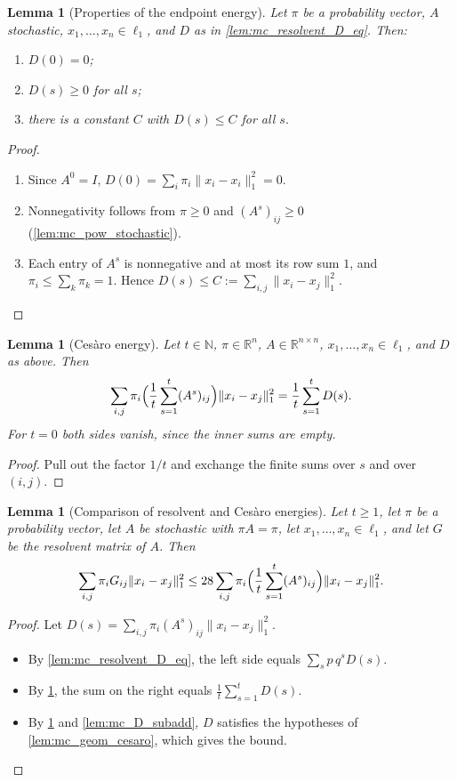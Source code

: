 \documentclass[11pt]{article}
\newtheorem{lemma}[theorem]{Lemma}
\theoremstyle{definition}
\theoremstyle{remark}
\newcommand{\R}{\mathbb{R}}
\newcommand{\N}{\mathbb{N}}
\newcommand{\lnorm}[1]{\lVert #1\rVert_{1}}
\begin{document}
\begin{lemma}[Properties of the endpoint energy]\label{lem:mc_D_props}
Let $\pi$ be a probability vector, $A$ stochastic, $x_1,\dots,x_n\in\ell_1$, and $D$ as in \cref{lem:mc_resolvent_D_eq}. Then:
\begin{enumerate}
\item $D(0)=0$;
\item $D(s)\ge0$ for all $s$;
\item there is a constant $C$ with $D(s)\le C$ for all $s$.
\end{enumerate}
\end{lemma}
\begin{proof}
\begin{enumerate}
\item Since $A^0=I$, $D(0)=\sum_i\pi_i\lnorm{x_i-x_i}^2=0$.
\item Nonnegativity follows from $\pi\ge0$ and $(A^s)_{ij}\ge0$ (\cref{lem:mc_pow_stochastic}).
\item Each entry of $A^s$ is nonnegative and at most its row sum $1$, and $\pi_i\le\sum_k\pi_k=1$. Hence $D(s)\le C:=\sum_{i,j}\lnorm{x_i-x_j}^2$. \qedhere
\end{enumerate}
\end{proof}

\begin{lemma}[Ces\`aro energy]\label{lem:mc_cesaro_rhs_eq}
Let $t\in\N$, $\pi\in\R^n$, $A\in\R^{n\times n}$, $x_1,\dots,x_n\in\ell_1$, and $D$ as above. Then
\[
\sum_{i,j}\pi_i\Bigl(\frac1t\sum_{s=1}^t(A^s)_{ij}\Bigr)\lnorm{x_i-x_j}^2=\frac1t\sum_{s=1}^tD(s).
\]
For $t=0$ both sides vanish, since the inner sums are empty.
\end{lemma}
\begin{proof}
Pull out the factor $1/t$ and exchange the finite sums over $s$ and over $(i,j)$.
\end{proof}

\begin{lemma}[Comparison of resolvent and Ces\`aro energies]\label{lem:mc_comparison}
Let $t\ge1$, let $\pi$ be a probability vector, let $A$ be stochastic with $\pi A=\pi$, let $x_1,\dots,x_n\in\ell_1$, and let $G$ be the resolvent matrix of $A$. Then
\[
\sum_{i,j}\pi_iG_{ij}\lnorm{x_i-x_j}^2\le28\sum_{i,j}\pi_i\Bigl(\frac1t\sum_{s=1}^t(A^s)_{ij}\Bigr)\lnorm{x_i-x_j}^2 .
\]
\end{lemma}
\begin{proof}
Let $D(s)=\sum_{i,j}\pi_i(A^s)_{ij}\lnorm{x_i-x_j}^2$.
\begin{itemize}
\item By \cref{lem:mc_resolvent_D_eq}, the left side equals $\sum_sp\,q^sD(s)$.
\item By \cref{lem:mc_cesaro_rhs_eq}, the sum on the right equals $\frac1t\sum_{s=1}^tD(s)$.
\item By \cref{lem:mc_D_props} and \cref{lem:mc_D_subadd}, $D$ satisfies the hypotheses of \cref{lem:mc_geom_cesaro}, which gives the bound. \qedhere
\end{itemize}
\end{proof}
\end{document}
